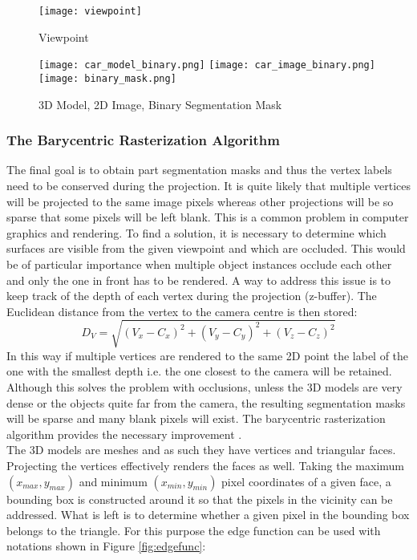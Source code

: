 \documentclass[main.tex]{subfiles}
\begin{document}
\begin{figure}[h]
    \centering
    \texttt{[image: viewpoint]}
    \caption{Viewpoint \cite{Xiang2014}}
    \label{fig:viewpoint}
\end{figure}
\begin{figure}[htp]
\centering
\texttt{[image: car\_model\_binary.png]}\hfill
\texttt{[image: car\_image\_binary.png]}\hfill
\texttt{[image: binary\_mask.png]}
\caption{3D Model, 2D Image, Binary Segmentation Mask}
\label{fig:binary}
\end{figure}
\subsubsection{The Barycentric Rasterization Algorithm}
The final goal is to obtain part segmentation masks and thus the vertex labels need to be conserved during the projection. It is quite likely that multiple vertices will be projected to the same image pixels whereas other projections will be so sparse that some pixels will be left blank. This is a common problem in computer graphics and rendering. To find a solution, it is necessary to determine which surfaces are visible from the given viewpoint and which are occluded. This would be of particular importance when multiple object instances occlude each other and only the one in front has to be rendered. A way to address this issue is to keep track of the depth of each vertex during the projection (z-buffer). The Euclidean distance from the vertex to the camera centre is then stored:
\begin{equation}
D_V = \sqrt{(V_x - C_x)^2 + (V_y - C_y)^2 + (V_z - C_z)^2}
\end{equation}
\indent In this way if multiple vertices are rendered to the same 2D point the label of the one with the smallest depth i.e. the one closest to the camera will be retained. Although this solves the problem with occlusions, unless the 3D models are very dense or the objects quite far from the camera, the resulting segmentation masks will be sparse and many blank pixels will exist. The barycentric rasterization algorithm provides the necessary improvement \cite{Rast2020}. \\ 
\indent The 3D models are meshes and as such they have vertices and triangular faces. Projecting the vertices effectively renders the faces as well. Taking the maximum $(x_{max},y_{max})$ and minimum $(x_{min},y_{min})$ pixel coordinates of a given face, a bounding box is constructed around it so that the pixels in the vicinity can be addressed. What is left is to determine whether a given pixel in the bounding box belongs to the triangle. For this purpose the edge function can be used \cite{Rast2020} with notations shown in Figure \ref{fig:edgefunc}:
\end{document}
